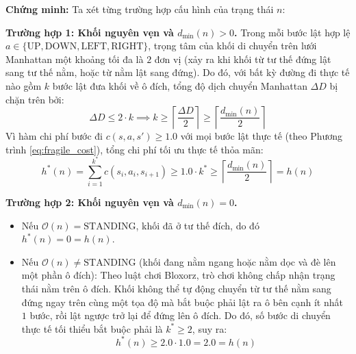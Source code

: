 \noindent
\textbf{Chứng minh:}
Ta xét từng trường hợp cấu hình của trạng thái $n$:

\noindent
\textbf{Trường hợp 1: Khối nguyên vẹn và $d_{\min}(n) > 0$.}
Trong mỗi bước lật hợp lệ
$a \in \{\text{UP}, \text{DOWN}, \text{LEFT}, \text{RIGHT}\}$,
trọng tâm của khối di chuyển trên lưới Manhattan một khoảng tối đa là
$2$ đơn vị (xảy ra khi khối từ tư thế đứng lật sang tư thế nằm, hoặc từ
nằm lật sang đứng). Do đó, với bất kỳ đường đi thực tế nào gồm $k$ bước
lật đưa khối về ô đích, tổng độ dịch chuyển Manhattan $\Delta D$ bị chặn
trên bởi:
\begin{equation}
    \Delta D \le 2 \cdot k \implies k \ge
    \left\lceil \dfrac{\Delta D}{2} \right\rceil \ge
    \left\lceil \dfrac{d_{\min}(n)}{2} \right\rceil
\end{equation}
Vì hàm chi phí bước đi $c(s, a, s') \ge 1.0$ với mọi bước lật thực tế
(theo Phương trình \ref{eq:fragile_cost}), tổng chi phí tối ưu thực tế
thỏa mãn:
\begin{equation}
    h^*(n) = \sum_{i=1}^{k^*} c(s_i, a_i, s_{i+1}) \ge 1.0 \cdot k^*
    \ge \left\lceil \dfrac{d_{\min}(n)}{2} \right\rceil = h(n)
\end{equation}

\noindent
\textbf{Trường hợp 2: Khối nguyên vẹn và $d_{\min}(n) = 0$.}
\begin{itemize}[--]
    \item Nếu $\mathcal{O}(n) = \text{STANDING}$, khối đã ở tư thế đích,
    do đó $h^*(n) = 0 = h(n)$.
    \item Nếu $\mathcal{O}(n) \neq \text{STANDING}$ (khối đang nằm ngang
    hoặc nằm dọc và đè lên một phần ô đích): Theo luật chơi Bloxorz, trò
    chơi không chấp nhận trạng thái nằm trên ô đích. Khối không thể tự
    động chuyển từ tư thế nằm sang đứng ngay trên cùng một tọa độ mà bắt
    buộc phải lật ra ô bên cạnh ít nhất $1$ bước, rồi lật ngược trở lại
    để đứng lên ô đích. Do đó, số bước di chuyển thực tế tối thiểu bắt
    buộc phải là $k^* \ge 2$, suy ra:
    \begin{equation}
        h^*(n) \ge 2.0 \cdot 1.0 = 2.0 = h(n)
    \end{equation}
\end{itemize}

